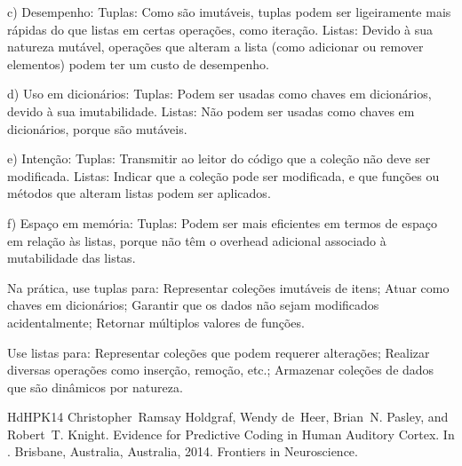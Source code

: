 \documentclass[letterpaper,10pt,english]{jupyterBook}
\begin{document}
\sphinxAtStartPar
c) Desempenho:
Tuplas: Como são imutáveis, tuplas podem ser ligeiramente mais rápidas do que listas em certas operações, como iteração.
Listas: Devido à sua natureza mutável, operações que alteram a lista (como adicionar ou remover elementos) podem ter um custo de desempenho.

\sphinxAtStartPar
d) Uso em dicionários:
Tuplas: Podem ser usadas como chaves em dicionários, devido à sua imutabilidade.
Listas: Não podem ser usadas como chaves em dicionários, porque são mutáveis.

\sphinxAtStartPar
e) Intenção:
Tuplas: Transmitir ao leitor do código que a coleção não deve ser modificada.
Listas: Indicar que a coleção pode ser modificada, e que funções ou métodos que alteram listas podem ser aplicados.

\sphinxAtStartPar
f) Espaço em memória:
Tuplas: Podem ser mais eficientes em termos de espaço em relação às listas, porque não têm o overhead adicional associado à mutabilidade das listas.

\sphinxAtStartPar
Na prática, use tuplas para:
Representar coleções imutáveis de itens;
Atuar como chaves em dicionários;
Garantir que os dados não sejam modificados acidentalmente;
Retornar múltiplos valores de funções.

\sphinxAtStartPar
Use listas para:
Representar coleções que podem requerer alterações;
Realizar diversas operações como inserção, remoção, etc.;
Armazenar coleções de dados que são dinâmicos por natureza.

\begin{sphinxthebibliography}{HdHPK14}
\sphinxAtStartPar
Christopher Ramsay Holdgraf, Wendy de Heer, Brian N. Pasley, and Robert T. Knight. Evidence for Predictive Coding in Human Auditory Cortex. In . Brisbane, Australia, Australia, 2014. Frontiers in Neuroscience.
\end{sphinxthebibliography}







\renewcommand{\indexname}{Index}
\printindex
\end{document}
